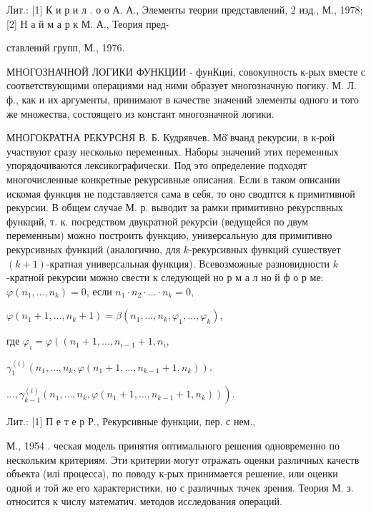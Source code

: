 \documentclass[10pt]{article}
\begin{document}
Лит.: [1] К и р и л . о о А. А., Элементы теории представлений, 2 изд., М., 1978; [2] Н а й м а р к М. А., Теория пред-

ставлений групп, М., 1976.



МНОГОЗНАЧНОЙ ЛОГИКИ ФУНКЦИИ - фунКциі, совокупность к-рых вместе с соответствующими операциями над ними образует многозначную погику. М. Л. ф., как и их аргументы, принимают в качестве значений элементы одного и того же множества, состоящего из констант многозначной логики.



МНОГОКРАТНА РЕКУРСНЯ В. Б. Кудрявчев. Мӧ̆ вчанд рекурсии, в к-рой участвуют сразу несколько переменных. Наборы значений этих переменных упорядочиваются лексикографически. Под это определение подходят многочисленные конкретные рекурсивные описания. Если в таком описании искомая функция не подставляется сама в себя, то оно сводптся к примитивной рекурсии. В общем случае М. р. выводит за рамки примитивно рекурспвных функций, т. к. посредством двукратной рекурсіи (ведущейся по двум переменным) можно построить функцию, универсальную для примитивно рекурсивных функций (аналогично, для $k$-рекурсивных функций сушествует $(k+1)$-кратная универсальная функция). Всевозможные разновидности $k$-кратной рекурсии можно свести к следующей но р м а л но й ф о р ме: $\varphi\left(n_{1}, \ldots, n_{k}\right)=0$, если $n_{1} \cdot n_{2} \cdot \ldots \cdot n_{k}=0$,



$\varphi\left(n_{1}+1, \ldots, n_{k}+1\right)=\beta\left(n_{1}, \ldots, n_{k}, \varphi_{1}, \ldots, \varphi_{k}\right)$,



где $\varphi_{i}=\varphi\left(\left(n_{1}+1, \ldots, n_{i-1}+1, n_{i}\right.\right.$,



$\gamma_{1}^{(i)}\left(n_{1}, \ldots, n_{k}, \varphi\left(n_{1}+1, \ldots, n_{k-1}+1, n_{k}\right)\right)$,



$\left.\ldots, \gamma_{k-1}^{(i)}\left(n_{1}, \ldots, n_{k}, \varphi\left(n_{1}+1, \ldots, n_{k-1}+1, n_{k}\right)\right)\right)$.



Лит.: [1] П е т е р Р., Рекурсивные функции, пер. с нем.,



М., 1954 . ческая модель принятия оптимального решения одновременно по нескольким критериям. Эти критерии могут отражать оценки различных качеств объекта (илі процесса), по поводу к-рых принимается решение, или оценки одной и той же его характеристики, но с различных точек зрения. Теория М. з. относится к числу математич. методов исследования операций.
\end{document}
